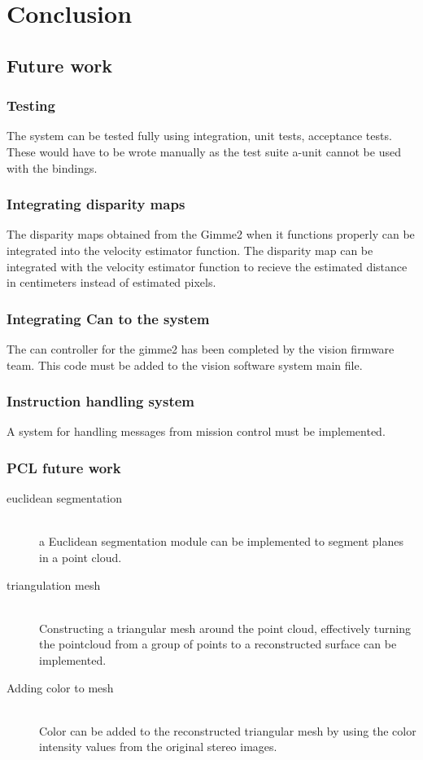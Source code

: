 \section{Conclusion}\label{sec:conclusion}
\subsection{Future work}
\subsubsection{Testing}
The system can be tested fully using integration, unit tests, acceptance tests. These would have to be wrote manually as the test suite a-unit cannot be used with the bindings.

\subsubsection{Integrating disparity maps}
The disparity maps obtained from the Gimme2 when it functions properly can be integrated into the velocity estimator function.
The disparity map can be integrated with the velocity estimator function to recieve the estimated distance in centimeters instead of estimated pixels.

\subsubsection{Integrating Can to the system}
The can controller for the gimme2 has been completed by the vision firmware team. This code must be added to the vision software system main file.

\subsubsection{Instruction handling system}
A system for handling messages from mission control must be implemented.

\subsubsection{PCL future work}
\begin{description}
\item[euclidean segmentation]\hfill \\
a Euclidean segmentation module can be implemented to segment planes in a point cloud.
\item[triangulation mesh]\hfill \\
Constructing a triangular mesh around the point cloud, effectively turning the pointcloud from a group of points to a reconstructed surface can be implemented.
\item[Adding color to mesh]\hfill \\
Color can be added to the reconstructed triangular mesh by using the color intensity values from the original stereo images.
\end{description}



